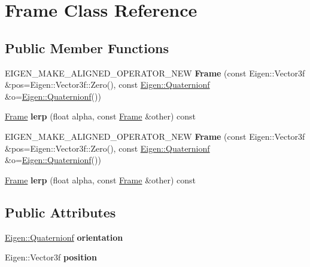 \hypertarget{class_frame}{}\section{Frame Class Reference}
\label{class_frame}
\subsection*{Public Member Functions}
\begin{DoxyCompactItemize}
\item 
\mbox{\label{class_frame_a1204f9941e023f07c9762e2328b0c4d2}} 
E\+I\+G\+E\+N\+\_\+\+M\+A\+K\+E\+\_\+\+A\+L\+I\+G\+N\+E\+D\+\_\+\+O\+P\+E\+R\+A\+T\+O\+R\+\_\+\+N\+EW {\bfseries Frame} (const Eigen\+::\+Vector3f \&pos=Eigen\+::\+Vector3f\+::\+Zero(), const \hyperlink{group___geometry___module_ga785b13a5a87f9bf55d4eba51ead2dcf0}{Eigen\+::\+Quaternionf} \&o=\hyperlink{group___geometry___module_ga785b13a5a87f9bf55d4eba51ead2dcf0}{Eigen\+::\+Quaternionf}())
\item 
\mbox{\label{class_frame_abcd65164dfe3d18a68e9e07bc2362102}} 
\hyperlink{class_frame}{Frame} {\bfseries lerp} (float alpha, const \hyperlink{class_frame}{Frame} \&other) const
\item 
\mbox{\label{class_frame_a1204f9941e023f07c9762e2328b0c4d2}} 
E\+I\+G\+E\+N\+\_\+\+M\+A\+K\+E\+\_\+\+A\+L\+I\+G\+N\+E\+D\+\_\+\+O\+P\+E\+R\+A\+T\+O\+R\+\_\+\+N\+EW {\bfseries Frame} (const Eigen\+::\+Vector3f \&pos=Eigen\+::\+Vector3f\+::\+Zero(), const \hyperlink{group___geometry___module_ga785b13a5a87f9bf55d4eba51ead2dcf0}{Eigen\+::\+Quaternionf} \&o=\hyperlink{group___geometry___module_ga785b13a5a87f9bf55d4eba51ead2dcf0}{Eigen\+::\+Quaternionf}())
\item 
\mbox{\label{class_frame_abcd65164dfe3d18a68e9e07bc2362102}} 
\hyperlink{class_frame}{Frame} {\bfseries lerp} (float alpha, const \hyperlink{class_frame}{Frame} \&other) const
\end{DoxyCompactItemize}
\subsection*{Public Attributes}
\begin{DoxyCompactItemize}
\item 
\mbox{\label{class_frame_a61a9cc27ce75eb335ed0fb8ed2de68b2}} 
\hyperlink{group___geometry___module_ga785b13a5a87f9bf55d4eba51ead2dcf0}{Eigen\+::\+Quaternionf} {\bfseries orientation}
\item 
\mbox{\label{class_frame_a93341288473d7af5db9aa0a257bce929}} 
Eigen\+::\+Vector3f {\bfseries position}
\end{DoxyCompactItemize}


